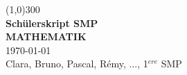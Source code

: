 \begin{titlepage}
	\begin{center}
	\line(1,0){300}  \\
	[0,5cm]
	\Huge{\bfseries Schülerskript SMP} \\
	[3cm]
	\textsc{ \bfseries MATHEMATIK}  \\
	[15cm]
	\small{\today} \\
	[2cm]
	\tiny{Clara, Bruno, Pascal, Rémy, ..., 1$^{ere}$ SMP}
	\end{center}
\end{titlepage}
